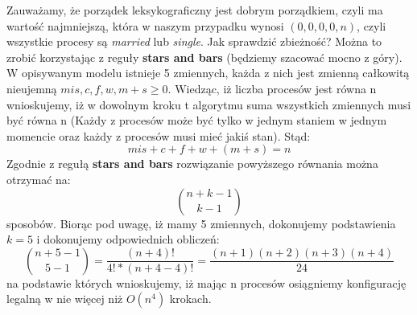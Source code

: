 \documentclass{article}
\begin{document}
    Zauważamy, że porządek leksykograficzny jest dobrym porządkiem, czyli ma wartość najmniejszą, która w naszym przypadku 
    wynosi $(0,0,0,0,n)$, czyli wszystkie procesy są \textit{married} lub \textit{single}.
    Jak sprawdzić zbieżność? Można to zrobić korzystając z reguły \textbf{stars and bars} (będziemy szacować mocno z góry).
    W opisywanym modelu istnieje 5 zmiennych, każda z nich jest zmienną całkowitą nieujemną $mis,c,f,w,m+s \geq 0$. Wiedząc, iż 
    liczba procesów jest równa n wnioskujemy, iż w dowolnym kroku t algorytmu suma wszystkich zmiennych musi być równa n (Każdy z procesów może być tylko w jednym staniem w jednym momencie
    oraz każdy z procesów musi mieć jakiś stan). Stąd:
    \begin{equation}
        mis+c+f+w+(m+s) = n
    \end{equation}
    Zgodnie z regułą \textbf{stars and bars} rozwiązanie powyższego równania można otrzymać na:
    \begin{equation}
        {n+k-1 \choose k-1}
    \end{equation}
    sposobów. Biorąc pod uwagę, iż mamy 5 zmiennych, dokonujemy podstawienia $k=5$ i dokonujemy odpowiednich obliczeń:
    \begin{equation}
        {n+5-1 \choose 5-1} = \frac{(n+4)!}{4!*(n+4-4)!} = \frac{(n+1)(n+2)(n+3)(n+4)}{24}
    \end{equation}
    na podstawie których wnioskujemy, iż mając n procesów osiągniemy konfigurację legalną w nie więcej niż $O(n^{4})$ krokach.
\end{document}
